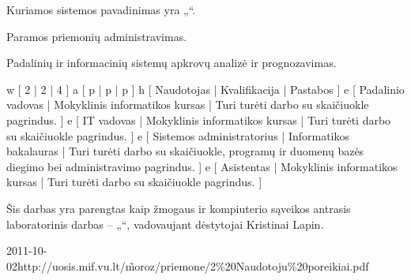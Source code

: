 Kuriamos sistemos pavadinimas yra „\systemname“.

Paramos priemonių administravimas.

Padalinių ir informacinių sistemų apkrovų analizė ir prognozavimas.



\xtable
{
  w [ 2 | 2 | 4 ]
  a [ p | p | p ]
  h [ Naudotojas | Kvalifikacija | Pastabos ]
  e [ Padalinio vadovas | Mokyklinis informatikos kursas
  | Turi turėti darbo su skaičiuokle pagrindus.
  ]
  e [ IT vadovas | Mokyklinis informatikos kursas
  | Turi turėti darbo su skaičiuokle pagrindus.
  ]
  e [ Sistemos administratorius | Informatikos bakalauras
  | Turi turėti darbo su skaičiuokle, programų ir duomenų bazės diegimo
  bei administravimo pagrindus.
  ]
  e [ Asistentas | Mokyklinis informatikos kursas
  | Turi turėti darbo su skaičiuokle pagrindus.
  ]
}

Šis darbas yra parengtas kaip žmogaus ir kompiuterio sąveikos
antrasis laboratorinis darbas – „\docname“, vadovaujant
dėstytojai Kristinai Lapin.

\xdoclist
{
  {2011-10-02}{http://uosis.mif.vu.lt/\~moroz/priemone/2\%20Naudotoju\%20poreikiai.pdf}
}
